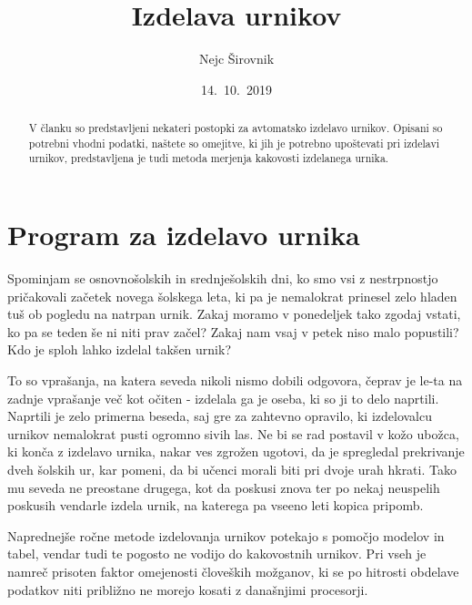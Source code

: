 \documentclass[a4paper,10pt]{article}
\begin{document}

\title{Izdelava urnikov}
\author{Nejc Širovnik}
\date{14.~10.~2019}
\maketitle

\begin{abstract}
   V članku so predstavljeni nekateri postopki za avtomatsko izdelavo urnikov. Opisani so
   potrebni vhodni podatki, naštete so omejitve, ki jih je potrebno upoštevati pri izdelavi
   urnikov, predstavljena je tudi metoda merjenja kakovosti izdelanega urnika.
\end{abstract}   
\section{Program za izdelavo urnika}

Spominjam se osnovnošolskih in srednješolskih dni, ko smo vsi z nestrpnostjo pričakovali
začetek novega šolskega leta, ki pa je nemalokrat prinesel zelo hladen tuš ob pogledu na
natrpan urnik. Zakaj moramo v ponedeljek tako zgodaj vstati, ko pa se teden še ni niti
prav začel? Zakaj nam vsaj v petek niso malo popustili? Kdo je sploh lahko izdelal
takšen urnik?

To so vprašanja, na katera seveda nikoli nismo dobili odgovora, čeprav je le-ta na zadnje
vprašanje več kot očiten - izdelala ga je oseba, ki so ji to delo naprtili. Naprtili je
zelo primerna beseda, saj gre za zahtevno opravilo, ki izdelovalcu urnikov nemalokrat
pusti ogromno sivih las. Ne bi se rad postavil v kožo ubožca, ki konča z izdelavo urnika,
nakar ves zgrožen ugotovi, da je spregledal prekrivanje dveh šolskih ur, kar pomeni, da
bi učenci morali biti pri dvoje urah hkrati. Tako mu seveda ne preostane drugega, kot da
poskusi znova ter po nekaj neuspelih poskusih vendarle izdela urnik, na katerega pa vseeno
leti kopica pripomb.

Naprednejše ročne metode izdelovanja urnikov potekajo s pomočjo modelov in tabel, vendar
tudi te pogosto ne vodijo do kakovostnih urnikov. Pri vseh je namreč prisoten faktor
omejenosti človeških možganov, ki se po hitrosti obdelave podatkov niti približno ne
morejo kosati z današnjimi procesorji.
\end{document}
